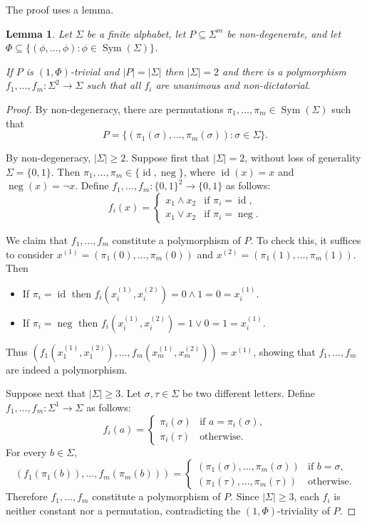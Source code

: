 \documentclass{article}
\DeclareMathOperator{\Sym}{Sym}
\DeclareMathOperator{\id}{id}
\DeclareMathOperator{\Neg}{neg}
\newtheorem{lemma}[theorem]{Lemma}
\theoremstyle{definition}
\theoremstyle{remark}
\begin{document}
The proof uses a lemma.

\begin{lemma}
\label{lem:filmus-identical}
Let $\Sigma$ be a finite alphabet, let $P \subseteq \Sigma^m$ be non-degenerate, and let $\Phi \subseteq \{(\phi,\dots,\phi) : \phi \in \Sym(\Sigma)\}$.

If $P$ is $(1,\Phi)$-trivial and $|P| = |\Sigma|$ then $|\Sigma| = 2$ and there is a polymorphism $f_1,\dots,f_m\colon \Sigma^2 \to \Sigma$ such that all $f_i$ are unanimous and non-dictatorial.
\end{lemma}
\begin{proof}
By non-degeneracy, there are permutations $\pi_1,\dots,\pi_m \in \Sym(\Sigma)$ such that
\[
 P = \{(\pi_1(\sigma),\dots,\pi_m(\sigma)) : \sigma \in \Sigma\}.
\]

By non-degeneracy, $|\Sigma| \ge 2$. Suppose first that $|\Sigma| = 2$, without loss of generality $\Sigma = \{0,1\}$. Then $\pi_1,\dots,\pi_m \in \{\id,\Neg\}$, where $\id(x) = x$ and $\Neg(x) = \lnot x$. Define $f_1,\dots,f_m\colon \{0,1\}^2 \to \{0,1\}$ as follows:
\[
 f_i(x) =
 \begin{cases}
 x_1 \land x_2 & \text{if } \pi_i = \id, \\
 x_1 \lor x_2 & \text{if } \pi_i = \Neg.
 \end{cases}
\]

We claim that $f_1,\dots,f_m$ constitute a polymorphism of $P$. To check this, it suffices to consider $x^{(1)} = (\pi_1(0), \dots, \pi_m(0))$ and $x^{(2)} = (\pi_1(1), \dots, \pi_m(1))$. Then
\begin{itemize}
\item If $\pi_i = \id$ then $f_i(x^{(1)}_i,x^{(2)}_i) = 0 \land 1 = 0 = x^{(1)}_i$.
\item If $\pi_i = \Neg$ then $f_i(x^{(1)}_i,x^{(2)}_i) = 1 \lor 0 = 1 = x^{(1)}_i$.
\end{itemize}
Thus $(f_1(x^{(1)}_1,x^{(2)}_1), \dots, f_m(x^{(1)}_m,x^{(2)}_m)) = x^{(1)}$, showing that $f_1,\dots,f_m$ are indeed a polymorphism.

Suppose next that $|\Sigma| \ge 3$. Let $\sigma,\tau \in \Sigma$ be two different letters. Define $f_1,\dots,f_m\colon \Sigma^1 \to \Sigma$ as follows:
\[
 f_i(a) =
 \begin{cases}
     \pi_i(\sigma) & \text{if } a = \pi_i(\sigma), \\
     \pi_i(\tau) & \text{otherwise}.
 \end{cases}
\]
For every $b \in \Sigma$,
\[
 (f_1(\pi_1(b)), \dots, f_m(\pi_m(b))) =
 \begin{cases}
     (\pi_1(\sigma),\dots,\pi_m(\sigma)) & \text{if } b = \sigma, \\
     (\pi_1(\tau),\dots,\pi_m(\tau)) & \text{otherwise}.
 \end{cases}
\]
Therefore $f_1,\dots,f_m$ constitute a polymorphism of $P$. Since $|\Sigma| \ge 3$, each $f_i$ is neither constant nor a permutation, contradicting the $(1,\Phi)$-triviality of $P$.
\end{proof}
\end{document}
